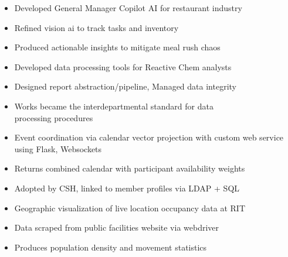 \documentclass[10pt,a4paper,ragged2e,withhyper]{altacv}
\begin{document}
\begin{paracol}{2}


\begin{itemize}
    \item Developed General Manager Copilot AI for restaurant industry
    \item Refined vision ai to track tasks and inventory
    \item Produced actionable insights to mitigate meal rush chaos
\end{itemize}

\divider

\begin{itemize}
    \item Developed data processing tools for Reactive Chem analysts
    \item Designed report abstraction/pipeline, Managed data integrity
    \item Works became the interdepartmental standard for data\\processing procedures
\end{itemize}


\begin{itemize}
    \item Event coordination via calendar vector projection with custom web service using Flask, Websockets
    \item Returns combined calendar with participant availability weights
    \item Adopted by CSH, linked to member profiles via LDAP + SQL
\end{itemize}

\divider

\begin{itemize}
    \item Geographic visualization of live location occupancy data at RIT
    \item Data scraped from public facilities website via webdriver
    \item Produces population density and movement statistics
\end{itemize}


\end{paracol}
\end{document}
